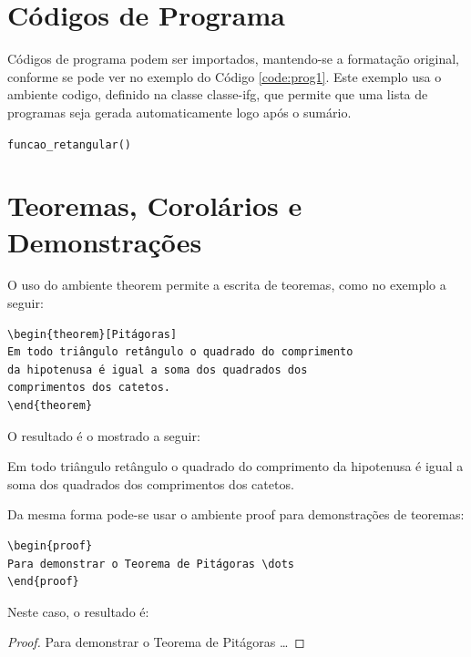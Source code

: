 \section{Códigos de Programa}
\label{sec:progs} 
Códigos de programa podem ser importados, mantendo-se a formatação original, conforme se pode ver no exemplo do Código \ref{code:prog1}. Este exemplo usa o ambiente \textsf{codigo}, definido na classe \textsf{classe-ifg}, que permite que uma lista de programas seja gerada automaticamente logo após o sumário.
\begin{center}
 \begin{codigo}[H]
   \small
   
   \caption{\texttt{funcao\_retangular()} }
   \label{code:prog1}
  \end{codigo}
\end{center}

\section{Teoremas, Corolários e Demonstrações}
\label{sec:teor}
 O uso do ambiente \textsf{theorem} permite a escrita de teoremas, como no exemplo a seguir:
\begin{verbatim}
\begin{theorem}[Pitágoras]
Em todo triângulo retângulo o quadrado do comprimento
da hipotenusa é igual a soma dos quadrados dos
comprimentos dos catetos.
\end{theorem}
\end{verbatim}

O resultado é o mostrado a seguir:

\begin{theorem}[Pitágoras]
Em todo triângulo retângulo o quadrado do comprimento da hipotenusa é igual a soma dos quadrados dos comprimentos dos catetos.
\end{theorem}

Da mesma forma pode-se usar o ambiente \textsf{proof} para demonstrações de teoremas:
\begin{verbatim}
\begin{proof}
Para demonstrar o Teorema de Pitágoras \dots
\end{proof}
\end{verbatim}

Neste caso, o resultado é:
\begin{proof}
Para demonstrar o Teorema de Pitágoras \dots
\end{proof}

